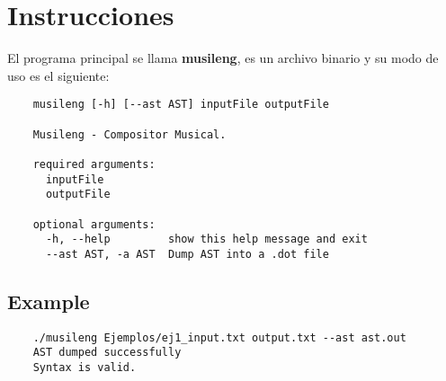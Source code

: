 \section{Instrucciones}

El programa principal se llama \textbf{musileng}, es un archivo binario y su modo de uso es el siguiente:

\begin{verbatim}
	musileng [-h] [--ast AST] inputFile outputFile

	Musileng - Compositor Musical.

	required arguments:
	  inputFile
	  outputFile

	optional arguments:
	  -h, --help         show this help message and exit
	  --ast AST, -a AST  Dump AST into a .dot file

\end{verbatim}

\subsection{Example}

\begin{verbatim}
	./musileng Ejemplos/ej1_input.txt output.txt --ast ast.out
	AST dumped successfully
	Syntax is valid.
\end{verbatim}